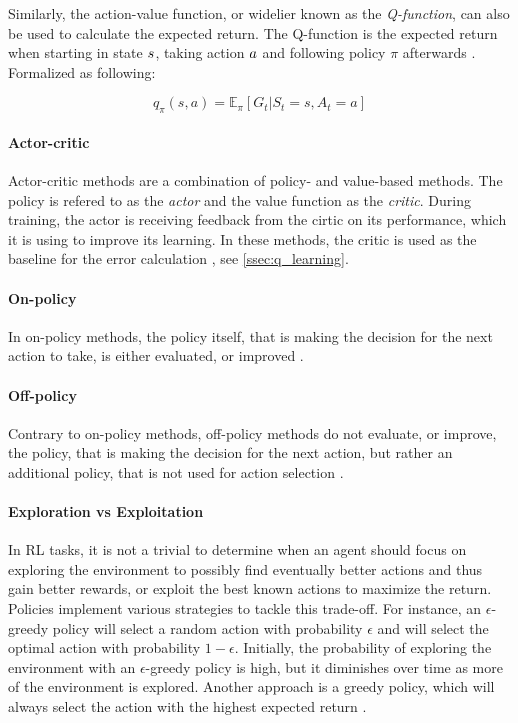 Similarly, the action-value function, or widelier known as the \textit{Q-function}, can also be used to calculate the expected return. The Q-function is the expected return when starting in state $\mathnormal{s}$, taking action $\mathnormal{a}$ and following policy $\pi$ afterwards \cite{Arulkumaran_2017}. Formalized as following:

\begin{equation}
q_{\pi}(s,a)=\mathbb{E}_{\pi}[G_t|S_t=s,A_t=a]
\label{eq:state_val_func}
\end{equation}

\paragraph{Actor-critic}
Actor-critic methods are a combination of policy- and value-based methods. The policy is refered to as the \textit{actor} and the value function as the \textit{critic}. During training, the actor is receiving feedback from the cirtic on its performance, which it is using to improve its learning. In these methods, the critic is used as the baseline for the error calculation \cite{Arulkumaran_2017}, see \ref{ssec:q_learning}. 

\paragraph{On-policy}
In on-policy methods, the policy itself, that is making the decision for the next action to take, is either evaluated, or improved \cite{richardsutton2018}.

\paragraph{Off-policy}
Contrary to on-policy methods, off-policy methods do not evaluate, or improve, the policy, that is making the decision for the next action, but rather an additional policy, that is not used for action selection \cite{richardsutton2018}.

\paragraph{Exploration vs Exploitation}
In RL tasks, it is not a trivial to determine when an agent should focus on exploring the environment to possibly find eventually better actions and thus gain better rewards, or exploit the best known actions to maximize the return. Policies implement various strategies to tackle this trade-off. For instance, an $\epsilon$-greedy policy will select a random action with probability $\epsilon$ and will select the optimal action with probability $1 - \epsilon$. Initially, the probability of exploring the environment with an $\epsilon$-greedy policy is high, but it diminishes over time as more of the environment is explored. Another approach is a greedy policy, which will always select the action with the highest expected return \cite{richardsutton2018}.


